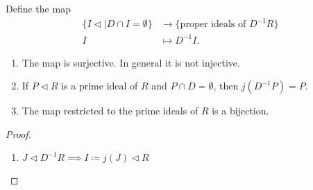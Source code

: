 \documentclass[master.tex]{subfiles}
\begin{document}
  \begin{prop}
    Define the map
    \begin{align*}
      \{I \lhd \mid D \cap I = \emptyset\} &\longrightarrow \{\text{proper ideals of } D^{-1}R\}\\
      I &\longmapsto D^{-1} I.
    \end{align*}
    \begin{enumerate}[label=(\alph*)]
    \item The map is surjective. In general it is not injective.
    \item If \(P \lhd R\) is a prime ideal of \(R\) and \(P \cap D = \emptyset\), then \(j(D^{-1}P)=P\).
    \item The map restricted to the prime ideals of \(R\) is a bijection.
    \end{enumerate}
  \end{prop}

  \begin{proof}
    \begin{enumerate}[label=(\alph*)]
    \item \(J \lhd D^{-1}R \implies I \coloneqq j(J) \lhd R\)
    \end{enumerate}
  \end{proof}
\end{document}
